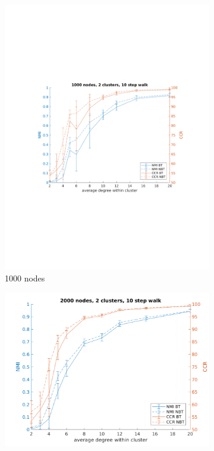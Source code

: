 \documentclass{article} %
\begin{document}
\begin{figure}[h] %
    \centering
        \begin{subfigure}{0.5\textwidth}
        \includegraphics[width=1.22\linewidth]{fig1/N1000K2len10.pdf} 
        \caption{1000 nodes}
        \label{fig:subim11}
    \end{subfigure}
    \hfill
    \begin{subfigure}{0.48\textwidth}
        \includegraphics[width=\linewidth]{fig1/N2000K2len10.pdf}

\end{subfigure}
\end{figure}
\end{document}
